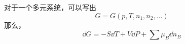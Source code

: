
\begin{issues}
\issueDraft
\end{issues}


对于一个多元系统，可以写出
\begin{equation}
G=G(p,T,n_1,n_2,...)
\end{equation}
那么，
\begin{equation}
\dd G=-S \dd T +V \dd P + \sum \mu_B \dd n_B
\end{equation}
